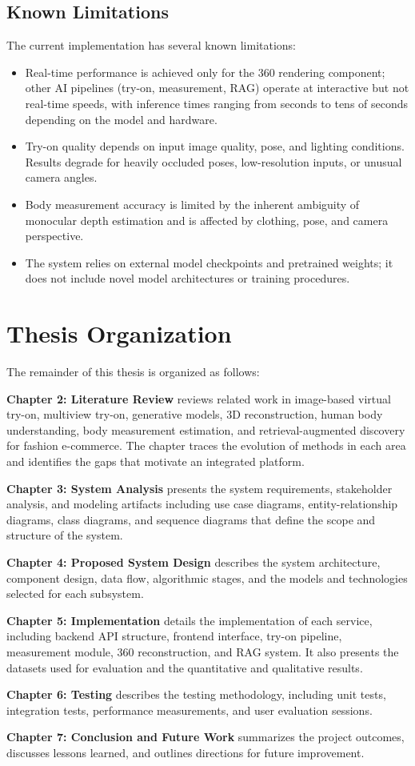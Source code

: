 \subsection{Known Limitations}
The current implementation has several known limitations:
\begin{itemize}[leftmargin=*]
    \item Real-time performance is achieved only for the 360 rendering component; other AI pipelines (try-on, measurement, RAG) operate at interactive but not real-time speeds, with inference times ranging from seconds to tens of seconds depending on the model and hardware.
    \item Try-on quality depends on input image quality, pose, and lighting conditions. Results degrade for heavily occluded poses, low-resolution inputs, or unusual camera angles.
    \item Body measurement accuracy is limited by the inherent ambiguity of monocular depth estimation and is affected by clothing, pose, and camera perspective.
    \item The system relies on external model checkpoints and pretrained weights; it does not include novel model architectures or training procedures.
\end{itemize}

\section{Thesis Organization}
The remainder of this thesis is organized as follows:

\textbf{Chapter 2: Literature Review} reviews related work in image-based virtual try-on, multiview try-on, generative models, 3D reconstruction, human body understanding, body measurement estimation, and retrieval-augmented discovery for fashion e-commerce. The chapter traces the evolution of methods in each area and identifies the gaps that motivate an integrated platform.

\textbf{Chapter 3: System Analysis} presents the system requirements, stakeholder analysis, and modeling artifacts including use case diagrams, entity-relationship diagrams, class diagrams, and sequence diagrams that define the scope and structure of the system.

\textbf{Chapter 4: Proposed System Design} describes the system architecture, component design, data flow, algorithmic stages, and the models and technologies selected for each subsystem.

\textbf{Chapter 5: Implementation} details the implementation of each service, including backend API structure, frontend interface, try-on pipeline, measurement module, 360 reconstruction, and RAG system. It also presents the datasets used for evaluation and the quantitative and qualitative results.

\textbf{Chapter 6: Testing} describes the testing methodology, including unit tests, integration tests, performance measurements, and user evaluation sessions.

\textbf{Chapter 7: Conclusion and Future Work} summarizes the project outcomes, discusses lessons learned, and outlines directions for future improvement.
